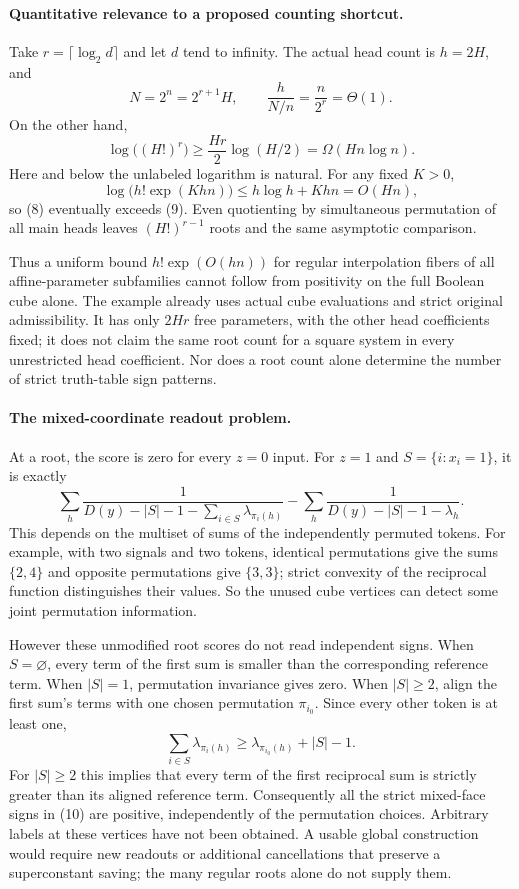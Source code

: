 \documentclass[11pt]{article}
\begin{document}
\paragraph{Quantitative relevance to a proposed counting shortcut.}
Take $r=\lceil\log_2 d\rceil$ and let $d$ tend to infinity. The
actual head count is $h=2H$, and
\[
 N=2^n=2^{r+1}H,\qquad
 \frac{h}{N/n}=\frac{n}{2^r}=\Theta(1).
 \tag{7}
\]
On the other hand,
\[
 \log\bigl((H!)^r\bigr)
 \geq \frac{Hr}{2}\log(H/2)
 =\Omega(Hn\log n).
 \tag{8}
\]
Here and below the unlabeled logarithm is natural. For any fixed
$K>0$,
\[
 \log\bigl(h!\exp(Khn)\bigr)
 \leq h\log h+Khn=O(Hn),
 \tag{9}
\]
so (8) eventually exceeds (9). Even quotienting by simultaneous
permutation of all main heads leaves $(H!)^{r-1}$ roots and the
same asymptotic comparison.

Thus a uniform bound $h!\exp(O(hn))$ for regular interpolation
fibers of all affine-parameter subfamilies cannot follow from
positivity on the full Boolean cube alone. The example already uses
actual cube evaluations and strict original admissibility. It has
only $2Hr$ free parameters, with the other head coefficients fixed;
it does not claim the same root count for a square system in every
unrestricted head coefficient. Nor does a root count alone determine
the number of strict truth-table sign patterns.

\paragraph{The mixed-coordinate readout problem.}
At a root, the score is zero for every $z=0$ input. For $z=1$ and
$S=\{i:x_i=1\}$, it is exactly
\[
 \sum_h\frac1{D(y)-|S|-1-\sum_{i\in S}\lambda_{\pi_i(h)}}
 -
 \sum_h\frac1{D(y)-|S|-1-\lambda_h}.
 \tag{10}
\]
This depends on the multiset of sums of the independently permuted
tokens. For example, with two signals and two tokens, identical
permutations give the sums $\{2,4\}$ and opposite permutations give
$\{3,3\}$; strict convexity of the reciprocal function distinguishes
their values. So the unused cube vertices can detect some joint
permutation information.

However these unmodified root scores do not read independent signs.
When $S=\varnothing$, every term of the first sum is smaller than the
corresponding reference term. When $|S|=1$, permutation invariance
gives zero. When $|S|\geq2$, align the first sum's terms with one
chosen permutation $\pi_{i_0}$. Since every other token is at least
one,
\[
 \sum_{i\in S}\lambda_{\pi_i(h)}
 \geq \lambda_{\pi_{i_0}(h)}+|S|-1.
 \tag{11}
\]
For $|S|\geq2$ this implies that every term of the first reciprocal
sum is strictly greater than its aligned reference term.
Consequently all the strict mixed-face signs in (10) are positive,
independently of the permutation choices. Arbitrary labels at these
vertices have not been obtained. A usable global construction would
require new readouts or additional cancellations that preserve a
superconstant saving; the many regular roots alone do not supply them.
\end{document}

